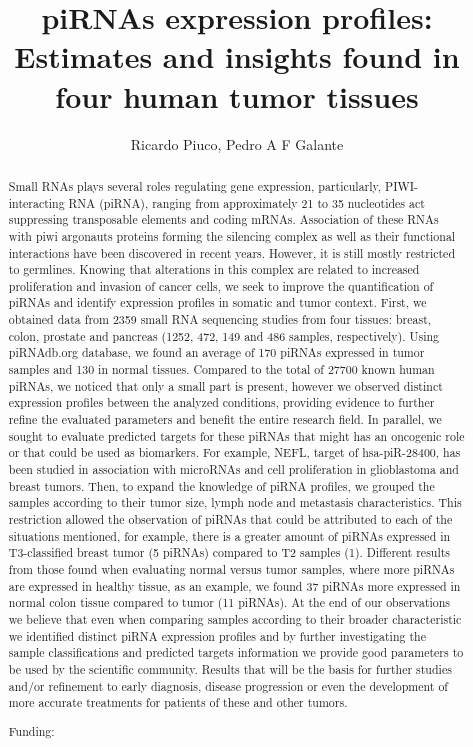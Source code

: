 \documentclass[twoside]{article}
\title{\vspace{-15mm}\fontsize{24pt}{10pt}\selectfont\textbf{ piRNAs expression profiles: Estimates and insights found in four human tumor tissues }} %
\author{ Ricardo Piuco, Pedro A F Galante }
\affil{  }
\date{}
\begin{document}
  
  
  \maketitle %
  
  
  \thispagestyle{fancy} %
  
  
  \begin{abstract}
  Small RNAs plays several roles regulating gene expression,  particularly,  PIWI-interacting RNA (piRNA),  ranging from approximately 21 to 35 nucleotides act suppressing transposable elements and coding mRNAs. Association of these RNAs with piwi argonauts proteins forming the silencing complex as well as their functional interactions have been discovered in recent years. However,  it is still mostly restricted to germlines. Knowing that alterations in this complex are related to increased proliferation and invasion of cancer cells,  we seek to improve the quantification of piRNAs and identify expression profiles in somatic and tumor context. First,  we obtained data from 2359 small RNA sequencing studies from four tissues: breast,  colon,  prostate and pancreas (1252,  472,  149 and 486 samples,  respectively). Using piRNAdb.org database,  we found an average of 170 piRNAs expressed in tumor samples and 130 in normal tissues. Compared to the total of 27700 known human piRNAs,  we noticed that only a small part is present,  however we observed distinct expression profiles between the analyzed conditions,  providing evidence to further refine the evaluated parameters and benefit the entire research field. In parallel,  we sought to evaluate predicted targets for these piRNAs that might has an oncogenic role or that could be used as biomarkers. For example,  NEFL,  target of hsa-piR-28400,  has been studied in association with microRNAs and cell proliferation in glioblastoma and breast tumors. Then,  to expand the knowledge of piRNA profiles,  we grouped the samples according to their tumor size,  lymph node and metastasis characteristics. This restriction allowed the observation of piRNAs that could be attributed to each of the situations mentioned,  for example,  there is a greater amount of piRNAs expressed in T3-classified breast tumor (5 piRNAs) compared to T2 samples (1). Different results from those found when evaluating normal versus tumor samples,  where more piRNAs are expressed in healthy tissue,  as an example,  we found 37 piRNAs more expressed in normal colon tissue compared to tumor (11 piRNAs). At the end of our observations we believe that even when comparing samples according to their broader characteristic we identified distinct piRNA expression profiles and by further investigating the sample classifications and predicted targets information we provide good parameters to be used by the scientific community. Results that will be the basis for further studies and/or refinement to early diagnosis,  disease progression or even the development of more accurate treatments for patients of these and other tumors.
  
  Funding:  \\ 
  \end{abstract}
  
\end{document}
